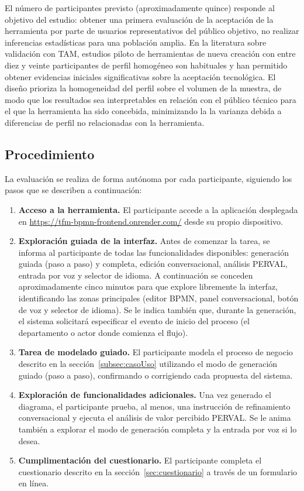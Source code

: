 El número de participantes previsto (aproximadamente quince) responde al objetivo del estudio: obtener una primera evaluación de la aceptación de la herramienta por parte de usuarios representativos del público objetivo, no realizar inferencias estadísticas para una población amplia. En la literatura sobre validación con TAM, estudios piloto de herramientas de nueva creación con entre diez y veinte participantes de perfil homogéneo son habituales y han permitido obtener evidencias iniciales significativas sobre la aceptación tecnológica. El diseño prioriza la homogeneidad del perfil sobre el volumen de la muestra, de modo que los resultados sea interpretables en relación con el público técnico para el que la herramienta ha sido concebida, minimizando la la varianza debida a diferencias de perfil no relacionadas con la herramienta.


\subsection{Procedimiento}
\label{subsec:procedimiento}

La evaluación se realiza de forma autónoma por cada participante, siguiendo los pasos que se describen a continuación:

\begin{enumerate}
  \item \textbf{Acceso a la herramienta.} El participante accede a la aplicación desplegada en \url{https://tfm-bpmn-frontend.onrender.com/} desde su propio dispositivo.

  \item \textbf{Exploración guiada de la interfaz.} Antes de comenzar la tarea, se informa al participante de todas las funcionalidades disponibles: generación guiada (paso a paso) y completa, edición conversacional, análisis PERVAL, entrada por voz y selector de idioma. A continuación se conceden aproximadamente cinco minutos para que explore libremente la interfaz, identificando las zonas principales (editor BPMN, panel conversacional, botón de voz y selector de idioma). Se le indica también que, durante la generación, el sistema solicitará especificar el evento de inicio del proceso (el departamento o actor donde comienza el flujo).

  \item \textbf{Tarea de modelado guiado.} El participante modela el proceso de negocio descrito en la sección~\ref{subsec:casoUso} utilizando el modo de generación guiado (paso a paso), confirmando o corrigiendo cada propuesta del sistema.

  \item \textbf{Exploración de funcionalidades adicionales.} Una vez generado el diagrama, el participante prueba, al menos, una instrucción de refinamiento conversacional y ejecuta el análisis de valor percibido PERVAL. Se le anima también a explorar el modo de generación completa y la entrada por voz si lo desea.

  \item \textbf{Cumplimentación del cuestionario.} El participante completa el cuestionario descrito en la sección~\ref{sec:cuestionario} a través de un formulario en línea.
\end{enumerate}

